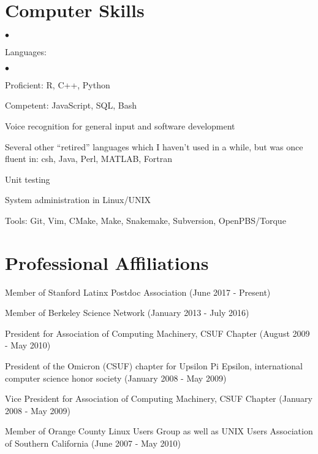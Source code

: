 \documentclass[overlapped]{res}
\newenvironment{list2}{
  \begin{list}{$\bullet$}{%
      \setlength{\itemsep}{0in}
      \setlength{\parsep}{0in} \setlength{\parskip}{0in}
      \setlength{\topsep}{0in} \setlength{\partopsep}{0in}
      \setlength{\leftmargin}{0.2in}}}{\end{list}}
\begin{document}
\begin{resume}
\section{\sc Computer Skills}
\begin{list2}
\item Languages:
  \begin{list2}
    \item Proficient: R, C++, Python
    \item Competent: JavaScript, SQL, Bash
  \end{list2}
\item Voice recognition for general input and software development
\item Several other ``retired'' languages which I haven't used in a while,
  but was once fluent in: csh, Java, Perl, MATLAB, Fortran
\item Unit testing
\item System administration in Linux/UNIX
\item Tools: Git, Vim, CMake, Make, Snakemake, Subversion, OpenPBS/Torque\\
\end{list2}
\vspace{-.65cm}

\newpage

\section{\sc Professional Affiliations}
Member of Stanford Latinx Postdoc Association
(June 2017 - Present)

Member of Berkeley Science Network
(January 2013 - July 2016)

President for Association of Computing Machinery, CSUF Chapter
(August 2009 - May 2010)

President of the Omicron (CSUF) chapter for Upsilon Pi Epsilon,
international computer science honor society (January 2008 - May 2009)

Vice President for Association of Computing Machinery, CSUF Chapter
(January 2008 - May 2009)

Member of Orange County Linux Users Group as well as UNIX Users
Association of Southern California (June 2007 - May 2010)






\end{resume}
\end{document}
